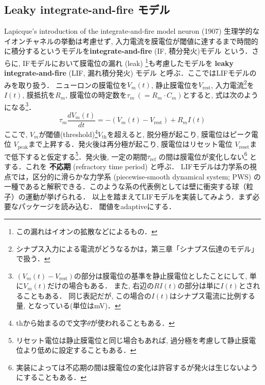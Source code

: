 \subsection{Leaky integrate-and-fire モデル}
Lapicque's introduction of the integrate-and-fire model neuron (1907)
生理学的なイオンチャネルの挙動は考慮せず, 入力電流を膜電位が閾値に達するまで時間的に積分するというモデルを\textbf{integrate-and-fire} (IF, 積分発火)モデル という．さらに, IFモデルにおいて膜電位の漏れ (leak) \footnote{この漏れはイオンの拡散などによるもの． }も考慮したモデルを \textbf{leaky integrate-and-fire} (LIF, 漏れ積分発火) モデル と呼ぶ．ここではLIFモデルのみを取り扱う．
ニューロンの膜電位を$V_m(t)$, 静止膜電位を$V_\text{rest}$, 入力電流\footnote{シナプス入力による電流がどうなるかは，第三章「シナプス伝達のモデル」で扱う．}を$I(t)$, 膜抵抗を$R_m$, 膜電位の時定数を$\tau_m\ (=R_m \cdot C_m)$とすると, 式は次のようになる\footnote{$(V_{m}(t)-V_\text{rest})$の部分は膜電位の基準を静止膜電位としたことにして, 単に$V_m(t)$だけの場合もある． また, 右辺の$RI(t)$の部分は単に$I(t)$とされることもある． 同じ表記だが, この場合の$I(t)$はシナプス電流に比例する量, となっている(単位はmV)． }．
\begin{equation}
\tau_m \frac{dV_{m}(t)}{dt}=-(V_{m}(t)-V_\text{rest})+R_mI(t)
\end{equation}
ここで, $V_m$が閾値(threshold)\footnote{thから始まるので文字$\theta$が使われることもある．}$V_{\text{th}}$を超えると, 脱分極が起こり, 膜電位はピーク電位 $V_{\text{peak}}$まで上昇する．発火後は再分極が起こり, 膜電位はリセット電位 $V_{\text{reset}}$まで低下すると仮定する\footnote{リセット電位は静止膜電位と同じ場合もあれば, 過分極を考慮して静止膜電位より低めに設定することもある．}．発火後, 一定の期間$\tau_{\text{ref}}$ の間は膜電位が変化しない\footnote{実装によっては不応期の間は膜電位の変化は許容するが発火は生じないようにすることもある．} とする．これを \textbf{不応期} (refractory time period) と呼ぶ．
LIFモデルは力学系の視点では，区分的に滑らかな力学系 (piecewise-smooth dynamical system; PWS) の一種であると解釈できる．このような系の代表例としては壁に衝突する球（粒子）の運動が挙げられる．
以上を踏まえてLIFモデルを実装してみよう．まず必要なパッケージを読み込む．
閾値をadaptiveにする．
